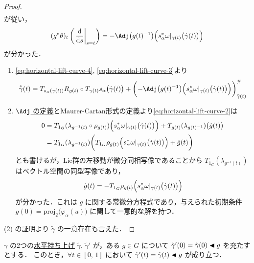 \documentclass[TQFT_main]{subfiles}
\begin{document}
\begin{proof}
\begin{align}
    \end{align}
    が従い，
    \begin{align}
        \label{eq:horizontal-lift-curve-3}
        (g^* \theta)_t \left( \eval{\dv{}{s}}_{s=t} \right) = -\Adj \bigl( g(t)^{-1} \bigr) \Bigl( s_\alpha^* \omega|_{\gamma(t)}\bigl(\dot{\gamma}(t)\bigr) \Bigr)
    \end{align}
    が分かった．
    \begin{enumerate}
        \item \eqref{eq:horizontal-lift-curve-4}, \eqref{eq:horizontal-lift-curve-3}より
        \begin{align}
            \dot{\tilde{\gamma}} (t) = T_{s_\alpha(\gamma(t))} R_{g(t)} \circ T_{\gamma(t)}s_\alpha \bigl(\dot{\gamma}(t)\bigr) + \biggl( -\Adj \bigl( g(t)^{-1} \bigr) \Bigl( s_\alpha^* \omega|_{\gamma(t)}\bigl(\dot{\gamma}(t)\bigr) \Bigr) \biggr)^\#_{\tilde{\gamma}(t)}
        \end{align}
        \item \hyperref[def:Lie-adj]{$\Adj$ の定義}とMaurer-Cartan形式の定義より\eqref{eq:horizontal-lift-curve-2}は
        \begin{align}
            0
            &= T_{1_G} (\lambda_{g^{-1}(t)} \circ \rho_{g(t)}) \Bigl( s_\alpha^* \omega|_{\gamma(t)} \bigl( \dot{\gamma}(t) \bigr)  \Bigr) + T_{g(t)} (\lambda_{g(t)^{-1}}) \bigl( \dot{g}(t) \bigr) \\
            &= T_{1_G} (\lambda_{g^{-1}(t)}) \biggl( T_{1_G} \rho_{g(t)} \Bigl( s_\alpha^* \omega|_{\gamma(t)} \bigl( \dot{\gamma}(t) \bigr)  \Bigr) + \dot{g}(t) \biggr)
        \end{align}
        とも書けるが，Lie群の左移動が微分同相写像であることから $T_{1_G} (\lambda_{g^{-1}(t)})$ はベクトル空間の同型写像であり，
        \begin{align}
            \dot{g}(t) = -T_{1_G} \rho_{g(t)} \Bigl(s_\alpha^* \omega|_{\gamma(t)} \bigl( \dot{\gamma}(t) \bigr)  \Bigr)
        \end{align}
        が分かった．これは $g$ に関する常微分方程式であり，与えられた初期条件 $g(0) = \mathrm{proj}_2 \bigl( \varphi_\alpha(u) \bigr)$ に関して一意的な解を持つ．
    \end{enumerate}
    (2) の証明より $\tilde{\gamma}$ の一意存在も言えた．
\end{proof}

\begin{myprop}[label=prop:horizontal-lift-init]{}
    $\gamma$ の2つの\hyperref[def:horizontal-lift-curve]{水平持ち上げ} $\tilde{\gamma},\, \tilde{\gamma}'$ が，ある $g \in G$ について $\tilde{\gamma}'(0) = \tilde{\gamma}(0) \blacktriangleleft g$ を充たすとする．
    このとき，$\forall t \in [0,\, 1]$ において $\tilde{\gamma}'(t) = \tilde{\gamma}(t) \blacktriangleleft g$ が成り立つ．
\end{myprop}
\end{document}
